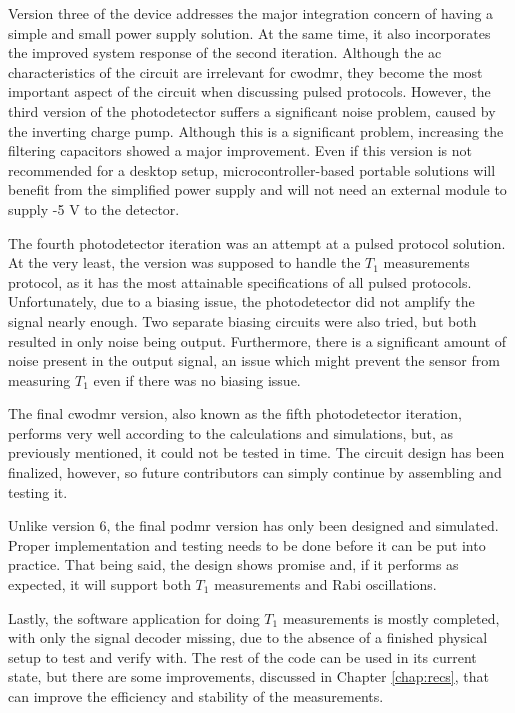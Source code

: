 Version three of the device addresses the major integration concern of having a simple and small power supply solution. At the same time, it also incorporates the improved system response of the second iteration. Although the \gls{ac} characteristics of the circuit are irrelevant for \gls{cwodmr}, they become the most important aspect of the circuit when discussing pulsed protocols. However, the third version of the photodetector suffers a significant noise problem, caused by the inverting charge pump. Although this is a significant problem, increasing the filtering capacitors showed a major improvement. Even if this version is not recommended for a desktop setup, microcontroller-based portable solutions will benefit from the simplified power supply and will not need an external module to supply -5 \unit{\volt} to the detector.

The fourth photodetector iteration was an attempt at a pulsed protocol solution. At the very least, the version was supposed to handle the $T_1$ measurements protocol, as it has the most attainable specifications of all pulsed protocols. Unfortunately, due to a biasing issue, the photodetector did not amplify the signal nearly enough. Two separate biasing circuits were also tried, but both resulted in only noise being output. Furthermore, there is a significant amount of noise present in the output signal, an issue which might prevent the sensor from measuring $T_1$ even if there was no biasing issue.

The final \gls{cwodmr} version, also known as the fifth photodetector iteration, performs very well according to the calculations and simulations, but, as previously mentioned, it could not be tested in time. The circuit design has been finalized, however, so future contributors can simply continue by assembling and testing it. 

Unlike version 6, the final \gls{podmr} version has only been designed and simulated. Proper implementation and testing needs to be done before it can be put into practice. That being said, the design shows promise and, if it performs as expected, it will support both $T_1$ measurements and Rabi oscillations. 

Lastly, the software application for doing $T_1$ measurements is mostly completed, with only the signal decoder missing, due to the absence of a finished physical setup to test and verify with. The rest of the code can be used in its current state, but there are some improvements, discussed in Chapter \ref{chap:recs}, that can improve the efficiency and stability of the measurements.


